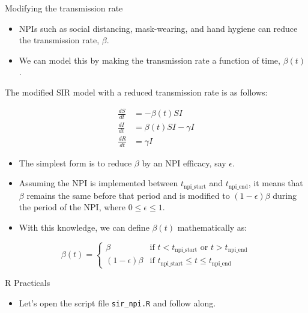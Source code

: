\documentclass[
  ignorenonframetext,
]{beamer}
\providecommand{\tightlist}{%
  \setlength{\itemsep}{0pt}\setlength{\parskip}{0pt}}\usepackage{longtable,booktabs,array}
\begin{document}
\begin{frame}
\begin{block}{Modifying the transmission rate}
\label{modifying-the-transmission-rate}
\begin{itemize}
\item
  NPIs such as social distancing, mask-wearing, and hand hygiene can
  reduce the transmission rate, \(\beta\).
\item
  We can model this by making the transmission rate a function of time,
  \(\beta (t)\).
\end{itemize}
\end{block}
\end{frame}

\begin{frame}
The modified SIR model with a reduced transmission rate is as follows:

\begin{align*}
\frac{dS}{dt} & = -\beta (t) S I \\
\frac{dI}{dt} & = \beta (t) S I - \gamma I \\
\frac{dR}{dt} & = \gamma I
\end{align*}
\end{frame}

\begin{frame}
\begin{itemize}
\item
  The simplest form is to reduce \(\beta\) by an NPI efficacy, say
  \(\epsilon\).
\item
  Assuming the NPI is implemented between \(t_{\text{npi\_start}}\) and
  \(t_{\text{npi\_end}}\), it means that \(\beta\) remains the same
  before that period and is modified to \((1- \epsilon)\beta\) during
  the period of the NPI, where \(0 \leq \epsilon \leq 1\).
\item
  With this knowledge, we can define \(\beta (t)\) mathematically as:
\end{itemize}

\begin{equation*}
\beta(t) = \begin{cases}
\beta & \text{if } t < t_{\text{npi\_start}} \text{ or } t > t_{\text{npi\_end}} \\
(1 - \epsilon) \beta & \text{if } t_{\text{npi\_start}} \le t \le t_{\text{npi\_end}}
\end{cases}
\end{equation*}
\end{frame}

\begin{frame}[fragile]
\begin{block}{R Practicals}
\label{r-practicals-2}
\begin{itemize}
\tightlist
\item
  Let's open the script file \texttt{sir\_npi.R} and follow along.
\end{itemize}
\end{block}
\end{frame}
\end{document}

